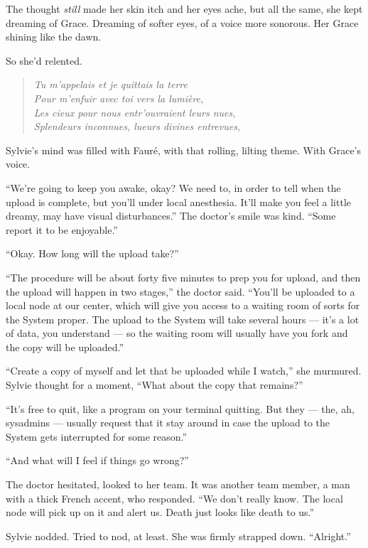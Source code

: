 The thought \emph{still} made her skin itch and her eyes ache, but all the same, she kept dreaming of Grace. Dreaming of softer eyes, of a voice more sonorous. Her Grace shining like the dawn.

So she'd relented.

\begin{quote}
\emph{Tu m'appelais et je quittais la terre\\
Pour m'enfuir avec toi vers la lumière,\\
Les cieux pour nous entr'ouvraient leurs nues,\\
Splendeurs inconnues, lueurs divines entrevues,}
\end{quote}

Sylvie's mind was filled with Fauré, with that rolling, lilting theme. With Grace's voice.

``We're going to keep you awake, okay? We need to, in order to tell when the upload is complete, but you'll under local anesthesia. It'll make you feel a little dreamy, may have visual disturbances.'' The doctor's smile was kind. ``Some report it to be enjoyable.''

``Okay. How long will the upload take?''

``The procedure will be about forty five minutes to prep you for upload, and then the upload will happen in two stages,'' the doctor said. ``You'll be uploaded to a local node at our center, which will give you access to a waiting room of sorts for the System proper. The upload to the System will take several hours --- it's a lot of data, you understand --- so the waiting room will usually have you fork and the copy will be uploaded.''

``Create a copy of myself and let that be uploaded while I watch,'' she murmured. Sylvie thought for a moment, ``What about the copy that remains?''

``It's free to quit, like a program on your terminal quitting. But they --- the, ah, sysadmins --- usually request that it stay around in case the upload to the System gets interrupted for some reason.''

``And what will I feel if things go wrong?''

The doctor hesitated, looked to her team. It was another team member, a man with a thick French accent, who responded. ``We don't really know. The local node will pick up on it and alert us. Death just looks like death to us.''

Sylvie nodded. Tried to nod, at least. She was firmly strapped down. ``Alright.''

